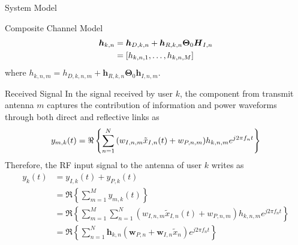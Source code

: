 \documentclass{IEEEtran}
\begin{document}
\begin{section} {System Model}
\begin{subsection}	{Composite Channel Model}
		\begin{equation}	\label{eq:h_{k,n}}
			\begin{split}
				\boldsymbol{h}_{k,n}
				&=\boldsymbol{h}_{D,k,n}+\boldsymbol{h}_{R,k,n}\boldsymbol{\Theta}_0\boldsymbol{H}_{I,n}	\\
				&=[h_{k,n,1},\dots,h_{k,n,M}]
			\end{split}
		\end{equation}
		where $h_{k,n,m}=h_{D,k,n,m}+\boldsymbol{h}_{R,k,n}\boldsymbol{\Theta}_0\boldsymbol{h}_{I,n,m}$.
	\end{subsection}

	\begin{subsection}	{Received Signal}
		In the signal received by user $k$, the component from transmit antenna $m$ captures the contribution of information and power waveforms through both direct and reflective links as
		\begin{equation}	\label{eq:y_{m,k}(t)}
			y_{m,k}(t)=\Re\left\{\sum_{n=1}^N{(w_{I,n,m}\tilde{x}_{I,n}(t)+w_{P,n,m})h_{k,n,m}e^{j2{\pi}{f_n}t}}\right\}
		\end{equation}
		Therefore, the RF input signal to the antenna of user $k$ writes as
		\begin{equation}	\label{eq:y_k(t)}
			\begin{split}
				y_k(t)
				&=y_{I,k}(t)+y_{P,k}(t)	\\
				&=\Re\left\{\sum_{m=1}^M{y_{m,k}(t)}\right\}	\\
				&=\Re\left\{\sum_{m=1}^M{\sum_{n=1}^N{(w_{I,n,m}\tilde{x}_{I,n}(t)+w_{P,n,m})h_{k,n,m}e^{j2{\pi}{f_n}t}}}\right\}	\\
				&=\Re\left\{\sum_{n=1}^N{\boldsymbol{h}_{k,n}(\boldsymbol{w}_{P,n}+\boldsymbol{w}_{I,n}\tilde{x}_n)e^{j2{\pi}{f_n}t}}\right\}
			\end{split}
		\end{equation}

\end{subsection}
\end{section}
\end{document}
